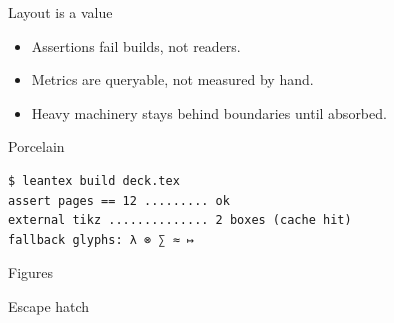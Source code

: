 \documentclass[aspectratio=169]{slides}
\begin{document}
\begin{frame}{Layout is a value}
  \begin{itemize}
    \item<1-> Assertions fail builds, not readers.
    \item<2-> Metrics are queryable, not measured by hand.
    \item<3-> Heavy machinery stays behind boundaries until absorbed.
  \end{itemize}
\end{frame}

\begin{frame}{Porcelain}
  \begin{verbatim}
$ leantex build deck.tex
assert pages == 12 ......... ok
external tikz .............. 2 boxes (cache hit)
fallback glyphs: λ ⊗ ∑ ≈ ↦
  \end{verbatim}
\end{frame}

\begin{frame}{Figures}
\end{frame}

\begin{frame}{Escape hatch}
  \begin{external}[tikz]
  \end{external}
\end{frame}
\end{document}
